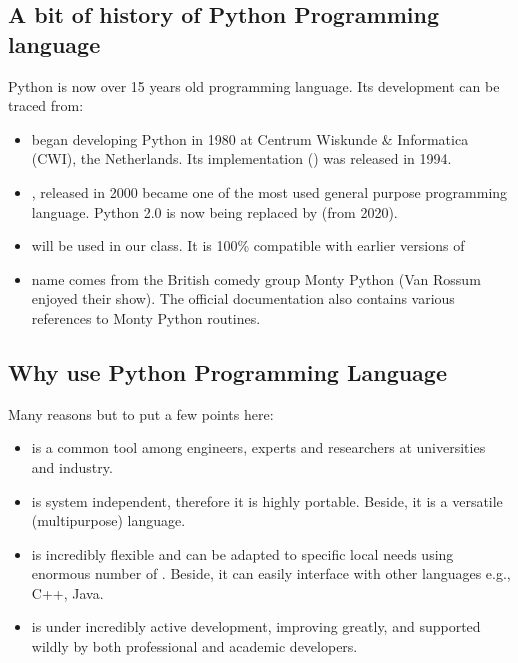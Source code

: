 \documentclass[letterpaper,10pt,english]{sphinxmanual}
\begin{document}
\subsection{A bit of history of Python Programming language}
\label{\detokenize{contents/background/01_python:a-bit-of-history-of-python-programming-language}}
Python is now over 15 years old programming language. Its development can be traced from:
\begin{itemize}
\item {} 
 began developing Python in 1980 at Centrum Wiskunde \& Informatica (CWI), the Netherlands. Its implementation () was released in 1994.

\item {} 
, released in 2000 became one of the most used general purpose programming language. Python 2.0 is now being replaced by  (from 2020).

\item {} 
 will be used in our class. It is  100\% compatible with earlier versions of 

\item {} 
 name comes from the British comedy group Monty Python (Van Rossum enjoyed their show). The official  documentation  also contains various references to Monty Python routines.

\end{itemize}


\subsection{Why use Python Programming Language}
\label{\detokenize{contents/background/01_python:why-use-python-programming-language}}
Many reasons but to put a few points here:
\begin{itemize}
\item {} 
 is a common tool among engineers, experts and researchers at universities and industry.

\item {} 
 is system independent, therefore it is highly portable. Beside, it is a versatile (multi\sphinxhyphen{}purpose) language.

\item {} 
 is incredibly flexible and can be adapted to specific local needs using enormous number of . Beside, it can easily interface with other languages e.g., C++, Java.

\item {} 
 is under incredibly active development, improving greatly, and supported wildly by both professional and academic developers.

\end{itemize}
\end{document}
